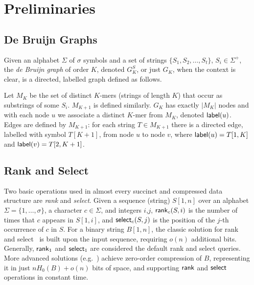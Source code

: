 \section{Preliminaries} \label{sec:preliminaries}

\subsection{De Bruijn Graphs} \label{sec:dbg}

Given an alphabet $\Sigma$ of $\sigma$ symbols and a set of strings $\lbrace
S_1, S_2, \ldots, S_t \rbrace$, $S_i \in \Sigma^{+}$, the {\em de Bruijn graph}
of order $K$, denoted $G^S_K$, or just $G_K$, when the context is clear, is a
directed, labelled graph defined as follows.

Let $M_{K}$ be the set of distinct $K$-mers (strings of length $K$) that occur
as substrings of some $S_i$. $M_{K+1}$ is defined similarly.  $G_K$ has exactly
$|M_{K}|$ nodes and with each node $u$ we associate a distinct $K$-mer from
$M_{K}$, denoted $\mathsf{label}(u)$. Edges are defined by $M_{K+1}$: for each
string $T \in M_{K+1}$ there is a directed edge, labelled with symbol $T[K+1]$,
from node $u$ to node $v$, where $\mathsf{label}(u) = T[1,K]$ and $\mathsf{label}(v) =
T[2,K+1]$. 

\subsection{Rank and Select} \label{sec:rank} Two basic operations used in almost
every succinct and compressed data structure are {\em rank} and {\em select}.
Given a sequence (string) $S[1,n]$ over an alphabet $\Sigma =
\{1,\ldots,\sigma\}$, a character $c \in \Sigma $, and integers $i$,$j$,
$\mathsf{rank}_c(S,i)$ is the number of times that $c$ appears in $S[1,i]$, and
$\mathsf{select}_c(S,j)$ is the position of the $j$-th occurrence of $c$ in $S$.
For a binary string $B[1,n]$, the classic solution for rank and
select~\cite{Mun96} is built upon the input sequence, requiring $o(n)$
additional bits.  Generally, $\mathsf{rank}_1$ and $\mathsf{select}_1$ are considered the
default rank and select queries.  More advanced solutions
(e.g.~\cite{bitvector}) achieve zero-order compression of $B$,
representing it in just $nH_0(B) + o(n)$ bits of space, and supporting $\mathsf{rank}$
and $\mathsf{select}$ operations in constant time. 

